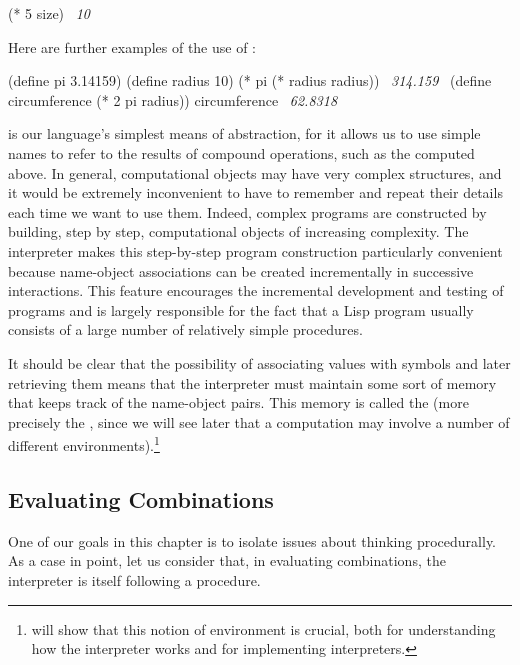 \begin{codeBlock}
(* 5 size)
~\textit{10}~
\end{codeBlock}

\noindent
Here are further examples of the use of :

\begin{codeBlock}
(define pi 3.14159)
(define radius 10)
(* pi (* radius radius))
~\textit{314.159}~
(define circumference (* 2 pi radius))
circumference
~\textit{62.8318}~
\end{codeBlock}

\noindent
{} is our language's simplest means of abstraction, for it allows us
to use simple names to refer to the results of compound operations, such as the
 computed above.  In general, computational objects may
have very complex structures, and it would be extremely inconvenient to have to
remember and repeat their details each time we want to use them.  Indeed,
complex programs are constructed by building, step by step, computational
objects of increasing complexity. The interpreter makes this step-by-step
program construction particularly convenient because name-object associations
can be created incrementally in successive interactions.  This feature
encourages the incremental development and testing of programs and is largely
responsible for the fact that a Lisp program usually consists of a large number
of relatively simple procedures.

It should be clear that the possibility of associating values with symbols and
later retrieving them means that the interpreter must maintain some sort of
memory that keeps track of the name-object pairs.  This memory is called the
 (more precisely the , since
we will see later that a computation may involve a number of different
environments).\footnote{ will show that this notion of
environment is crucial, both for understanding how the interpreter works and
for implementing interpreters.}

\subsection{Evaluating Combinations}
\label{Section 1.1.3}

One of our goals in this chapter is to isolate issues about thinking
procedurally.  As a case in point, let us consider that, in evaluating
combinations, the interpreter is itself following a procedure.

